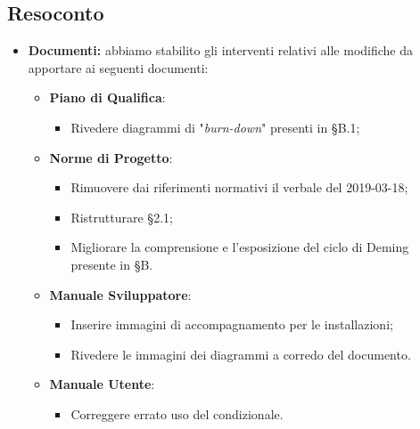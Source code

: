 \subsection{Resoconto}
\begin{itemize}
	\item{ \textbf{Documenti:} abbiamo stabilito gli interventi relativi alle modifiche da apportare ai seguenti documenti:
		\begin{itemize}
			\item \textbf{Piano di Qualifica}: 
			\begin{itemize}
				\item Rivedere diagrammi di "\emph{burn-down}" presenti in §B.1;
			\end{itemize}
			\item \textbf{Norme di Progetto}:
			\begin{itemize}
				\item Rimuovere dai riferimenti normativi il verbale del 2019-03-18;
				\item Ristrutturare §2.1;
				\item Migliorare la comprensione e l'esposizione del ciclo di Deming presente in §B.
			\end{itemize}
					\item \textbf{Manuale Sviluppatore}:
			\begin{itemize}
				\item Inserire immagini di accompagnamento per le installazioni;
				\item Rivedere le immagini dei diagrammi a corredo del documento.
			\end{itemize}
				\item \textbf{Manuale Utente}:
			\begin{itemize}
				\item Correggere errato uso del condizionale.
			\end{itemize}
		\end{itemize}}	

\end{itemize}


